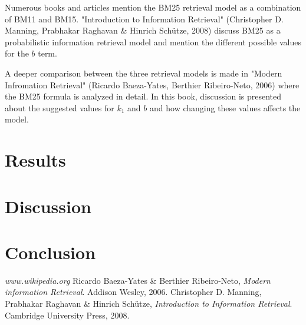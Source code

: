 \documentclass[letterpaper,11pt]{article}
\begin{document}
Numerous books and articles mention the BM25 retrieval model as a combination of BM11 and BM15. "Introduction to Information Retrieval"  (Christopher D. Manning, Prabhakar Raghavan \& Hinrich Schütze, 2008) discuss BM25 as a probabilistic information retrieval model and mention the different possible values for the $b$ term. 

A deeper comparison between the three retrieval models is made in "Modern Infromation Retrieval" (Ricardo Baeza-Yates, Berthier Ribeiro-Neto, 2006) where the BM25 formula is analyzed in detail. In this book, discussion is presented about the suggested values for $k_1$ and $b$ and how changing these values affects the model. 






\section{Results}


\section{Discussion}

\section{Conclusion}



\begin{thebibliography}{9}
\emph{www.wikipedia.org}
  Ricardo Baeza-Yates \& Berthier Ribeiro-Neto,
   \emph{Modern information Retrieval}.
  Addison Wesley,
  2006.
  Christopher D. Manning, Prabhakar Raghavan \& Hinrich Schütze,
  \emph{Introduction to Information Retrieval}.
  Cambridge University Press,
  2008.



\end{thebibliography}

    
\end{document}
